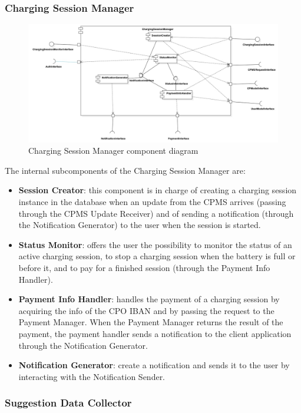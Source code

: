 \documentclass{Configuration_Files/PoliMi3i_thesis}
\begin{document}
\subsubsection{Charging Session Manager}

\begin{figure}[H]
    \centering
    \includegraphics[width=1\textwidth]{Images/component/ChargingSessionManager.jpg}
    \caption{Charging Session Manager component diagram}
\end{figure}

The internal subcomponents of the Charging Session Manager are:
\begin{itemize}
    \item \textbf{Session Creator}: this component is in charge of creating a charging session instance in the database when an update from the CPMS arrives (passing through the CPMS Update Receiver) and of sending a notification (through the Notification Generator) to the user when the session is started.
    \item \textbf{Status Monitor}: offers the user the possibility to monitor the status of an active charging session, to stop a charging session when the battery is full or before it, and to pay for a finished session (through the Payment Info Handler).
    \item \textbf{Payment Info Handler}: handles the payment of a charging session by acquiring the info of the CPO IBAN and by passing the request to the Payment Manager. When the Payment Manager returns the result of the payment, the payment handler sends a notification to the client application through the Notification Generator.
    \item \textbf{Notification Generator}: create a notification and sends it to the user by interacting with the Notification Sender.
\end{itemize}

\subsubsection{Suggestion Data Collector}
\end{document}
